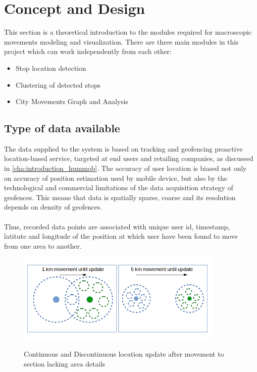 \chapter{Concept and Design}
\label{cha:conceptanddesign}

This section is a theoretical introduction to the modules required for macroscopic movements modeling and visualization. There are three main modules in this project which can work independently from each other:

\begin{itemize}  
\item Stop location detection
\item Clustering of detected stops 
\item City Movements Graph and Analysis
\end{itemize}

\section{Type of data available}

The data supplied to the system is based on tracking and geofencing proactive location-based
service, targeted at end users and retailing companies, as discussed in \autoref{cha:introduction_hummob}. The accuracy of user location is biased not only on accuracy of position estimation used by mobile device, but also by the technological and commercial limitations of the data acquisition strategy of geofences. This means that data is spatially sparse, coarse and its resolution depends on density of geofences.
\\\\
Thus, recorded data points are associated with unique user id, timestamp, latitute and longitude of the position at which user have been found to move from one area to another.

\begin{figure}[!ht]
	\centering
	\includegraphics[width=0.9\textwidth]{images/movement_update.png}\\
	\caption{Continuous and Discontinuous location update after movement to section lacking area details }
	\label{fig:movement_update}
\end{figure}
\FloatBarrier

